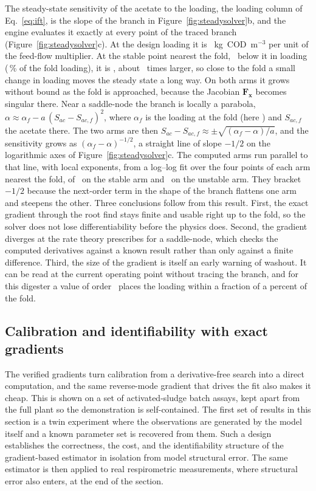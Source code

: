 \documentclass{article}
\begin{document}
The steady-state sensitivity of the acetate to the loading, the loading column of Eq.~\eqref{eq:ift}, is the slope of the branch in Figure~\ref{fig:steadysolver}b, and the engine evaluates it exactly at every point of the traced branch (Figure~\ref{fig:steadysolver}c). At the design loading it is \SteadySensDesign~kg~COD~m\(^{-3}\) per unit of the feed-flow multiplier. At the stable point nearest the fold, \SteadySensNearDist\ below it in loading (\SteadySensNearPct\,\% of the fold loading), it is \SteadySensNearFold, about \SteadySensGain\ times larger, so close to the fold a small change in loading moves the steady state a long way. On both arms it grows without bound as the fold is approached, because the Jacobian \(\mathbf{F}_{\mathbf{x}}\) becomes singular there. Near a saddle-node the branch is locally a parabola, \(\alpha\approx\alpha_f-a\,(S_{ac}-S_{ac,f})^2\), where \(\alpha_f\) is the loading at the fold (here \SteadyFoldDil) and \(S_{ac,f}\) the acetate there. The two arms are then \(S_{ac}-S_{ac,f}\approx\pm\sqrt{(\alpha_f-\alpha)/a}\), and the sensitivity grows as \((\alpha_f-\alpha)^{-1/2}\), a straight line of slope \(-1/2\) on the logarithmic axes of Figure~\ref{fig:steadysolver}c. The computed arms run parallel to that line, with local exponents, from a log--log fit over the four points of each arm nearest the fold, of \SteadySensExpStable\ on the stable arm and \SteadySensExpUnstable\ on the unstable arm. They bracket \(-1/2\) because the next-order term in the shape of the branch flattens one arm and steepens the other. Three conclusions follow from this result. First, the exact gradient through the root find stays finite and usable right up to the fold, so the solver does not lose differentiability before the physics does. Second, the gradient diverges at the rate theory prescribes for a saddle-node, which checks the computed derivatives against a known result rather than only against a finite difference. Third, the size of the gradient is itself an early warning of washout. It can be read at the current operating point without tracing the branch, and for this digester a value of order \SteadySensNearFold\ places the loading within a fraction of a percent of the fold.

\subsection{Calibration and identifiability with exact gradients}
\label{sec:results-diff}

The verified gradients turn calibration from a derivative-free search into a direct computation, and the same reverse-mode gradient that drives the fit also makes it cheap. This is shown on a set of activated-sludge batch assays, kept apart from the full plant so the demonstration is self-contained. The first set of results in this section is a twin experiment where the observations are generated by the model itself and a known parameter set is recovered from them. Such a design establishes the correctness, the cost, and the identifiability structure of the gradient-based estimator in isolation from model structural error. The same estimator is then applied to real respirometric measurements, where structural error also enters, at the end of the section.
\end{document}
